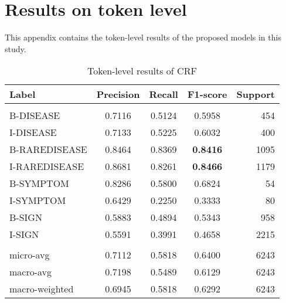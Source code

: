 \documentclass[preprint,12pt]{elsarticle}
\begin{document}
\section{Results on token level}
\label{sec:apptoken}
This appendix contains the token-level results of the proposed models  in this study. 
\begin{table}[H]
\centering
\caption{\label{tab:CRFtoken}Token-level results of CRF}
\begin{tabular}{lcccr}
\\
{\bf Label} & {\bf Precision} &
{\bf Recall} &
{\bf F1-score} & {\bf Support} \\
\hline\\[-8pt]

B-DISEASE	&	0.7116	&	0.5124	&	0.5958	&	454\\
I-DISEASE	&	0.7133	&	0.5225	&	0.6032	&	400\\
B-RAREDISEASE	&	0.8464	&	0.8369	&	\bf 0.8416	&	1095\\
I-RAREDISEASE	&	0.8681	&	0.8261	&	\bf 0.8466	&	1179\\
B-SYMPTOM	&	0.8286	&	0.5800	&	0.6824	&	54\\
I-SYMPTOM	&	0.6429	&	0.2250	&	0.3333	&	80\\
B-SIGN	&	0.5883	&	0.4894	&	0.5343	&	958\\
I-SIGN	&	0.5591	&	0.3991	&	0.4658	&	2215\\
\\
micro-avg	&	0.7112	&	0.5818	&	0.6400	&	6243\\
macro-avg	&	0.7198	&	0.5489	&	0.6129	&	6243\\
macro-weighted	&	0.6945	&	0.5818	&	0.6292	&	6243\\
\hline

\end{tabular}
\end{table}
\end{document}

